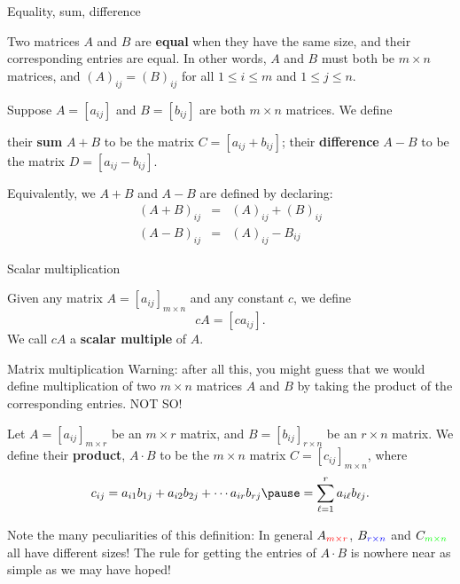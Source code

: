 \begin{frame}{Equality, sum, difference}
\begin{definition}
Two matrices $A$ and $B$ are {\bf equal} when 
\bb
\ii they have the same size, and 
\ii their corresponding entries are equal.
\ee
In other words, $A$ and $B$ must both be $m\times n$ matrices, and $(A)_{ij}=(B)_{ij}$ for all $1\leq i\leq m$ and $1\leq j\leq n$. 
\end{definition}
\pause
\begin{definition}
Suppose $A=[a_{ij}]$ and $B=[b_{ij}]$ are both $m\times n$ matrices. We define 
\begin{itemize}
\ii their {\bf sum} $A+B$ to be the matrix $C=[a_{ij}+b_{ij}]$; 
\ii their {\bf difference} $A-B$ to be the matrix $D=[a_{ij}-b_{ij}]$. 
\end{itemize}
\pause Equivalently, we $A+B$ and $A-B$ are defined by declaring:
\begin{eqnarray*}
(A+B)_{ij}&=&(A)_{ij}+(B)_{ij}\\
(A-B)_{ij}&=&(A)_{ij}-B_{ij}
\end{eqnarray*}
\end{definition}
\end{frame}
\begin{frame}{Scalar multiplication}
\begin{definition}
Given any matrix $A=[a_{ij}]_{m\times n}$ and any constant $c$, we define
\[
cA=[ca_{ij}].
\] 
We call $cA$ a {\bf scalar multiple} of $A$. 
\end{definition}
\pause
\begin{comment}
It is best to think of scalar multiplication as a sort of \alert{hybrid} operation that takes two different types of object, a constant (or {\bf scalar}) $c$ and a matrix $A$, and spits back a matrix. 
\bpause In particular it is important to keep straight the difference between scalar multiplication and \alert{matrix multiplication}, which we consider next. 
\end{comment}
\end{frame}
\begin{frame}{Matrix multiplication}
\alert{Warning:} after all this, you might guess that we would  define multiplication of two $m\times n$ matrices $A$ and $B$ by taking the product of the corresponding entries. \alert{NOT SO!}
\pause
\begin{definition}
Let $A=[a_{ij}]_{m\times r}$ be an {\color{red} $m\times r$} matrix, and $B=[b_{ij}]_{r\times n}$ be an {\color{blue} $r\times n$} matrix. 
\bpause 
We define their {\bf product}, $A\cdot B$ to be the {\color{green}$m\times n$} matrix $C=[c_{ij}]_{m\times n}$, where 
\[
c_{ij}=a_{i1}b_{1j}+a_{i2}b_{2j}+\cdots a_{ir}b_{rj}\pause=\sum_{\ell=1}^ra_{i\ell}b_{\ell j}.
\]
\end{definition}
\pause Note the many peculiarities of this definition:
\bb
\pause\ii In general $A_{{\color{red}m\times r}}$, $B_{\color{blue} r\times n}$ and $C_{\color{green} m\times n}$ all have different sizes!
\pause\ii The rule for getting the entries of $A\cdot B$ is nowhere near as simple as we may have hoped! 
\ee
\end{frame}
